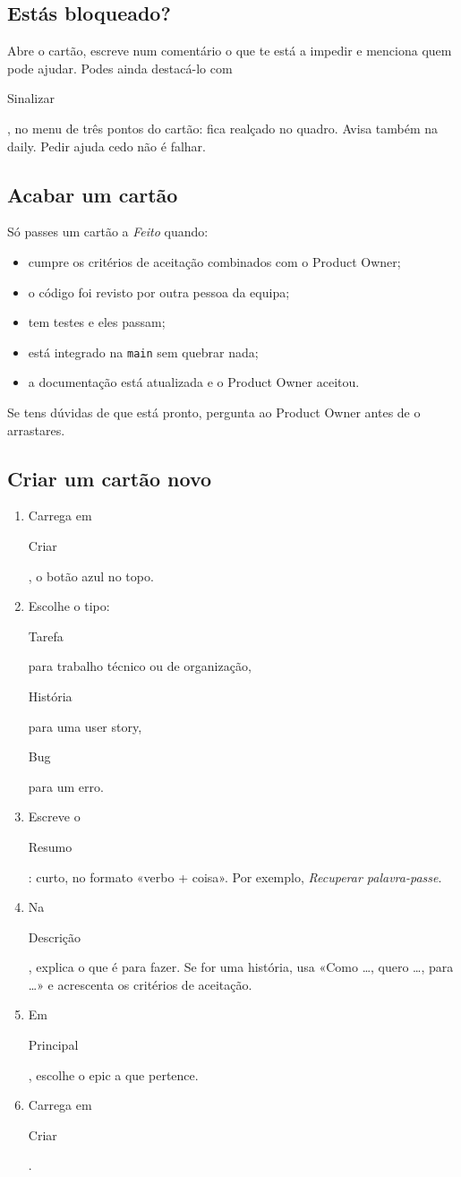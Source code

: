 \documentclass[11pt,a4paper]{article}
\newcommand{\btn}[1]{{\setlength{\fboxsep}{1.6pt}\colorbox{azulclaro}{\sffamily\small\strut #1}}}
\begin{document}
\subsection{Estás bloqueado?}

Abre o cartão, escreve num comentário o que te está a impedir e menciona quem pode ajudar. Podes ainda destacá-lo com \btn{Sinalizar}, no menu de três pontos do cartão: fica realçado no quadro. Avisa também na daily. Pedir ajuda cedo não é falhar.

\subsection{Acabar um cartão}

Só passes um cartão a \textit{Feito} quando:

\begin{itemize}[label=\textcolor{azul}{$\square$}]
  \item cumpre os critérios de aceitação combinados com o Product Owner;
  \item o código foi revisto por outra pessoa da equipa;
  \item tem testes e eles passam;
  \item está integrado na \texttt{main} sem quebrar nada;
  \item a documentação está atualizada e o Product Owner aceitou.
\end{itemize}

Se tens dúvidas de que está pronto, pergunta ao Product Owner antes de o arrastares.

\subsection{Criar um cartão novo}

\begin{enumerate}
  \item Carrega em \btn{Criar}, o botão azul no topo.
  \item Escolhe o tipo: \btn{Tarefa} para trabalho técnico ou de organização, \btn{História} para uma user story, \btn{Bug} para um erro.
  \item Escreve o \btn{Resumo}: curto, no formato «verbo + coisa». Por exemplo, \textit{Recuperar palavra-passe}.
  \item Na \btn{Descrição}, explica o que é para fazer. Se for uma história, usa «Como \dots, quero \dots, para \dots» e acrescenta os critérios de aceitação.
  \item Em \btn{Principal}, escolhe o epic a que pertence.
  \item Carrega em \btn{Criar}.
\end{enumerate}
\end{document}
